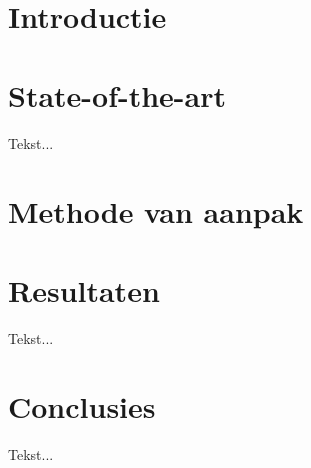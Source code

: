 \documentclass[fleqn,10pt]{voorstel}
\begin{document}
\flushbottom %

\maketitle %

\tableofcontents %

\thispagestyle{empty} %


\section{Introductie} %



\section{State-of-the-art}
Tekst...


\section{Methode van aanpak}


\section{Resultaten}
Tekst...

\section{Conclusies}
Tekst...




\end{document}
